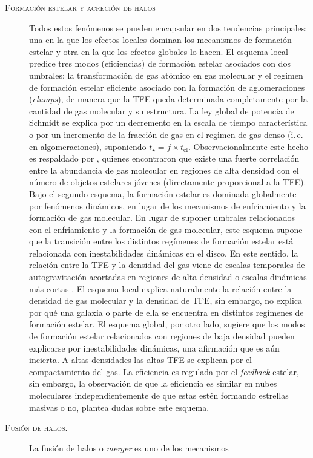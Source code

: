 \documentclass[xcolor=dvipsnames,4pt,hyperref={colorlinks,citecolor=black,linkcolor=black,urlcolor=black}]{beamer}
\begin{document}
\begin{frame}[allowframebreaks]{\textsc{Formación estelar y acreción de halos}}
\begin{description}
Todos estos fenómenos se pueden encapsular en dos tendencias principales: una en la que los efectos
locales dominan los mecanismos de formación estelar y otra en la que los efectos globales lo hacen.
El esquema local predice tres modos (eficiencias) de formación estelar asociados con dos umbrales:
la transformación de gas atómico en gas molecular y el regimen de formación estelar eficiente
asociado con la formación de aglomeraciones (\emph{clumps}), de manera que la TFE queda determinada
completamente por la cantidad de gas molecular y su estructura. La ley global de potencia de Schmidt
se explica por un decremento en la escala de tiempo característica o por un incremento de la
fracción de gas en el regimen de gas denso (i.\,e. en algomeraciones), suponiendo $t_\star=f\times
t_\text{cl}$. Observacionalmente este hecho es respaldado por \citet{Lada2010}, quienes encontraron
que existe una fuerte correlación entre la abundancia de gas molecular en regiones de alta densidad
con el número de objetos estelares jóvenes (directamente proporcional a la TFE).
Bajo el segundo esquema, la formación estelar es dominada globalmente por fenómenos dinámicos, en
lugar de los mecanismos de enfriamiento y la formación de gas molecular. En lugar de suponer
umbrales relacionados con el enfriamiento y la formación de gas molecular, este esquema supone que
la transición entre los distintos regímenes de formación estelar está relacionada con
inestabilidades dinámicas en el disco. En este sentido, la relación entre la TFE y la densidad del
gas viene de escalas temporales de autogravitación acortadas en regiones de alta densidad o escalas
dinámicas más cortas \citep[e.\,g.][]{Ostriker2010}.
%
El esquema local explica naturalmente la relación entre la densidad de gas molecular y la densidad
de TFE, sin embargo, no explica por qué una galaxia o parte de ella se encuentra en distintos
regímenes de formación estelar. El esquema global, por otro lado, sugiere que los modos de formación
estelar relacionados con regiones de baja densidad pueden explicarse por inestabilidades dinámicas,
una afirmación que es aún incierta. A altas densidades las altas TFE se explican por el
compactamiento del gas. La eficiencia es regulada por el \emph{feedback} estelar, sin embargo, la
observación de que la eficiencia es similar en nubes moleculares independientemente de que estas
estén formando estrellas masivas o no, plantea dudas sobre este esquema.
%
\item[\textsc{Fusión de halos.}] La fusión de halos o \emph{merger} es uno de los mecanismos

\end{description}
\end{frame}
\end{document}
